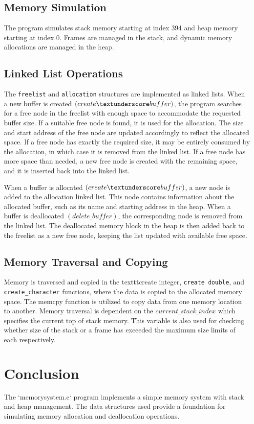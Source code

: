 \documentclass{article}
\begin{document}
\subsection*{Memory Simulation}
The program simulates stack memory starting at index 394 and heap memory starting at index 0. Frames are managed in the stack, and dynamic memory allocations are managed in the heap.

\subsection*{Linked List Operations}
The \texttt{freelist} and \texttt{allocation} structures are implemented as linked lists. When a new buffer is created $(create \textunderscore buffer)$, the program searches for a free node in the freelist with enough space to accommodate the requested buffer size.
If a suitable free node is found, it is used for the allocation. The size and start address of the free node are updated accordingly to reflect the allocated space.
If a free node has exactly the required size, it may be entirely consumed by the allocation, in which case it is removed from the linked list.
If a free node has more space than needed, a new free node is created with the remaining space, and it is inserted back into the linked list.

When a buffer is allocated $(create \textunderscore buffer)$, a new node is added to the allocation linked list. This node contains information about the allocated buffer, such as its name and starting address in the heap.
When a buffer is deallocated $(delete\_buffer)$, the corresponding node is removed from the linked list.
The deallocated memory block in the heap is then added back to the freelist as a new free node, keeping the list updated with available free space.

\subsection*{Memory Traversal and Copying}
Memory is traversed and copied in the texttt{create \textunderscore integer}, \texttt{create \textunderscore double}, and \texttt{create\_character} functions, where the data is copied to the allocated memory space.
The memcpy function is utilized to copy data from one memory location to another.
Memory traversal is dependent on the $current\_stack\_index$ which specifies the current top of stack memory.
This variable is also used for checking whether size of the stack or a frame has exceeded the maximum size limits of each respectively.

\section*{Conclusion}
The `memorysystem.c` program implements a simple memory system with stack and heap management. The data structures used provide a foundation for simulating memory allocation and deallocation operations.
\end{document}
